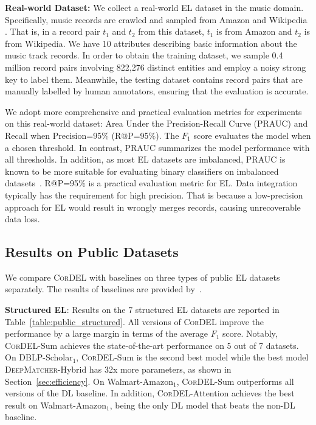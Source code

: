 \documentclass[conference]{IEEEtran}
\begin{document}
\textbf{Real-world Dataset:} We collect a real-world EL dataset in the music domain. Specifically, music records are crawled and sampled from Amazon and Wikipedia \cite{zhucollective}. That is, in a record pair $t_1$ and $t_2$ from this dataset, $t_1$ is from Amazon and $t_2$ is from Wikipedia. We have 10 attributes describing basic information about the music track records.
In order to obtain the training dataset, we sample 0.4 million record pairs involving 822,276 distinct entities and employ a noisy strong key to label them. Meanwhile, the testing dataset contains record pairs that are manually labelled by human annotators, ensuring that the evaluation is accurate.

We adopt more comprehensive and practical evaluation metrics for experiments on this real-world dataset: Area Under the Precision-Recall Curve (PRAUC) and Recall when Precision=95$\%$ (R@P=95$\%$). The $F_1$ score evaluates the model when a chosen threshold. In contrast, PRAUC summarizes the model performance with all thresholds. In addition, as most EL datasets are imbalanced, PRAUC is known to be more suitable for evaluating binary classifiers on imbalanced datasets~\cite{saito2015precision}. R@P=95$\%$ is a practical evaluation metric for EL. Data integration typically has the requirement for high precision. That is because a low-precision approach for EL would result in wrongly merges records, causing unrecoverable data loss.


\subsection{Results on Public Datasets}

We compare \textsc{CorDEL} with baselines on three types of public EL datasets separately. The results of baselines are provided by~\cite{mudgal2018deep}.

\textbf{Structured EL}: Results on the 7 structured EL datasets are reported in Table~\ref{table:public_structured}. All versions of \textsc{CorDEL} improve the performance by a large margin in terms of the average $F_1$ score. Notably, \textsc{CorDEL}-Sum achieves the state-of-the-art performance on 5 out of 7 datasets. On DBLP-Scholar$_1$, \textsc{CorDEL}-Sum is the second best model while the best model \textsc{DeepMatcher}-Hybrid has 32x more parameters, as shown in Section~\ref{sec:efficiency}. On Walmart-Amazon$_1$, \textsc{CorDEL}-Sum outperforms all versions of the DL baseline. In addition, \textsc{CorDEL}-Attention achieves the best result on Walmart-Amazon$_1$, being the only DL model that beats the non-DL baseline.
    
\end{document}
